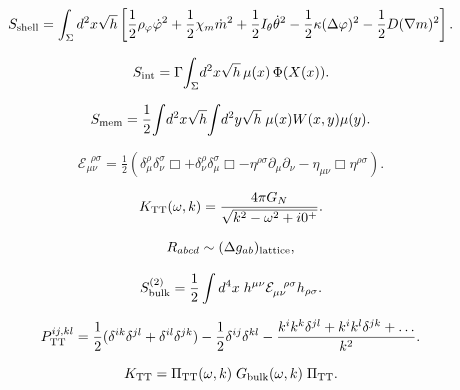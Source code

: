 \[
S_{\rm shell} = \int_{\Sigma} d^2x\sqrt{h}
\left[
\frac{1}{2}\rho_\varphi \dot{\varphi}^2
+ \frac{1}{2}\chi_m \dot{m}^2
+ \frac{1}{2}I_\theta \dot{\theta}^2
- \frac{1}{2}\kappa (\Delta\varphi)^2
- \frac{1}{2}D (\nabla m)^2
\right].
\]

\[
S_{\rm int}
= \Gamma\!\int_{\Sigma}\! d^2x\sqrt{h}\,\mu(x)\,\Phi(X(x)).
\]

\[
S_{\rm mem}
= \frac{1}{2}\!\int\! d^2x\sqrt{h}\!\int\! d^2y\sqrt{h}\;\mu(x)W(x,y)\mu(y).
\]

\[
\mathcal E_{\mu\nu}^{\ \ \rho\sigma}
= \tfrac12(\delta_\mu^\rho \delta_\nu^\sigma\Box
+ \delta_\nu^\rho\delta_\mu^\sigma\Box
- \eta^{\rho\sigma}\partial_\mu\partial_\nu
- \eta_{\mu\nu}\Box\eta^{\rho\sigma}).
\]

\[
K_{\rm TT}(\omega,k)
= \frac{4\pi G_N}{\sqrt{k^2 - \omega^2 + i0^+}}.
\]

\[
R_{abcd} \sim (\Delta g_{ab})_{\rm lattice},
\]

\[
S_{\rm bulk}^{(2)} = \frac{1}{2}\int d^4x\; h^{\mu\nu}\mathcal E_{\mu\nu}^{\ \ \rho\sigma}h_{\rho\sigma}.
\]

\[
P_{\rm TT}^{ij,kl} = 
\frac12(\delta^{ik}\delta^{jl} + \delta^{il}\delta^{jk})
- \frac12\delta^{ij}\delta^{kl}
- \frac{k^i k^k \delta^{jl} + k^i k^l \delta^{jk}+\dots}{k^2}.
\]

\[
K_{\rm TT} = \Pi_{\rm TT}(\omega,k)\;G_{\rm bulk}(\omega,k)\;\Pi_{\rm TT}.
\]

